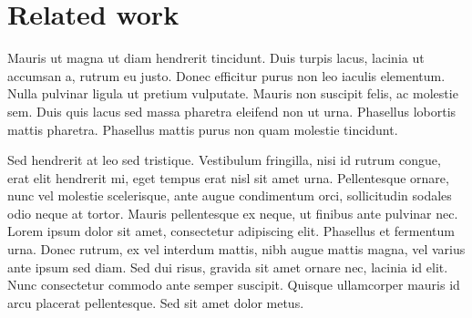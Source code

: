 \section{Related work}

Mauris ut magna ut diam hendrerit tincidunt. Duis turpis lacus, lacinia ut accumsan a, rutrum eu justo. Donec efficitur purus non leo iaculis elementum. Nulla pulvinar ligula ut pretium vulputate. Mauris non suscipit felis, ac molestie sem. Duis quis lacus sed massa pharetra eleifend non ut urna. Phasellus lobortis mattis pharetra. Phasellus mattis purus non quam molestie tincidunt.

Sed hendrerit at leo sed tristique. Vestibulum fringilla, nisi id rutrum congue, erat elit hendrerit mi, eget tempus erat nisl sit amet urna. Pellentesque ornare, nunc vel molestie scelerisque, ante augue condimentum orci, sollicitudin sodales odio neque at tortor. Mauris pellentesque ex neque, ut finibus ante pulvinar nec. Lorem ipsum dolor sit amet, consectetur adipiscing elit. Phasellus et fermentum urna. Donec rutrum, ex vel interdum mattis, nibh augue mattis magna, vel varius ante ipsum sed diam. Sed dui risus, gravida sit amet ornare nec, lacinia id elit. Nunc consectetur commodo ante semper suscipit. Quisque ullamcorper mauris id arcu placerat pellentesque. Sed sit amet dolor metus.